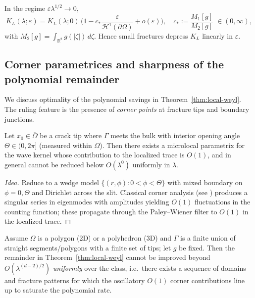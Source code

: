 \begin{corollary}
\label{cor:small-crack-KL}
In the regime $\varepsilon\lambda^{1/2}\to 0$,
\[
K_L(\lambda;\varepsilon)=K_L(\lambda;0)\,\Big(1 - c_*\frac{\varepsilon}{\mathcal{H}^1(\partial\Omega)} + o(\varepsilon)\Big),
\quad
c_*:=\frac{M_1[g]}{M_2[g]}\;\in(0,\infty),
\]
with $M_2[g]=\int_{\mathbb{R}^2}g(|\zeta|)\,d\zeta$. Hence small fractures depress $K_L$ linearly in $\varepsilon$.
\end{corollary}

\subsection{Corner parametrices and sharpness of the polynomial remainder}
\label{sub:corner-sharpness}

We discuss optimality of the polynomial savings in Theorem~\ref{thm:local-weyl}. The ruling
feature is the presence of \emph{corner points} at fracture tips and boundary junctions.

\begin{proposition}
\label{prop:corner-parametrix}
Let $x_0\in\overline{\Omega}$ be a crack tip where $\Gamma$ meets the bulk with interior
opening angle $\Theta\in(0,2\pi]$ (measured within $\Omega$).
Then there exists a microlocal parametrix for the wave kernel whose contribution to the localized trace is
$O(1)$, and in general cannot be reduced below $O(\lambda^{0})$ uniformly in $\lambda$.
\end{proposition}

\begin{proof}[Idea]
Reduce to a wedge model $\{(r,\phi): 0<\phi<\Theta\}$ with mixed boundary on $\phi=0,\Theta$
and Dirichlet across the slit. Classical corner analysis (see \cite{KozlovNazarovPlamenevskii2001})
produces a singular series in eigenmodes with amplitudes yielding $O(1)$ fluctuations in the
counting function; these propagate through the Paley--Wiener filter to $O(1)$ in the localized trace.
\end{proof}

\begin{theorem}
\label{thm:sharpness}
Assume $\Omega$ is a polygon (2D) or a polyhedron (3D) and $\Gamma$ is a finite union
of straight segments/polygons with a finite set of tips; let $g$ be fixed. Then the remainder
in Theorem~\ref{thm:local-weyl} cannot be improved beyond $O(\lambda^{(d-2)/2})$ \emph{uniformly}
over the class, i.e.\ there exists a sequence of domains and fracture patterns for which
the oscillatory $O(1)$ corner contributions line up to saturate the polynomial rate.
\end{theorem}

